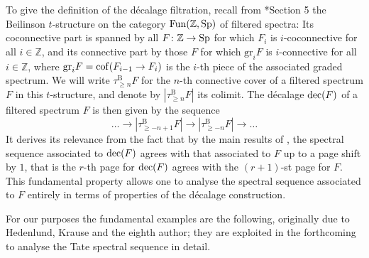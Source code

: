 To give the definition of the décalage filtration, recall from \cite{ariotta}*{Section 5} the Beilinson $t$-structure on the category $\operatorname{Fun}(\mathbb Z,\mathrm{Sp})$ of filtered spectra: Its coconnective part is spanned by all $F \colon \mathbb {\mathbb{Z}} \rightarrow \mathrm{Sp}$ for which $F_i$ is $i$-coconnective for all $i \in \mathbb Z$, and its connective part by those $F$ for which $\mathrm{gr}_iF$ is $i$-connective for all $i \in \mathbb Z$, where $\mathrm{gr}_iF = \operatorname{cof}(F_{i-1} \rightarrow F_i)$ is the $i$-th piece of the associated graded spectrum. We will write $\tau_{\geq n}^\mathrm B F$ for the $n$-th connective cover of a filtered spectrum $F$ in this $t$-structure, and denote by $|\tau_{\geq n}^\mathrm B F|$ its colimit.
The décalage $\mathrm{dec}(F)$ of a filtered spectrum $F$ is then given by the sequence
\[
\dots \longrightarrow |\tau_{\geq -n+1}^\mathrm B F| \longrightarrow |\tau_{\geq -n}^\mathrm B F| \longrightarrow \dots
\]
It derives its relevance from the fact that by the main results of \cite{antieau-dec}, the spectral sequence associated to $\mathrm{dec}(F)$ agrees with that associated to $F$ up to a page shift by $1$, that is the $r$-th page for $\mathrm{dec}(F)$ agrees with the $(r+1)$-st page for $F$. This fundamental property allows one to analyse the spectral sequence associated to $F$ entirely in terms of properties of the décalage construction. 

For our purposes the fundamental examples are the following, originally due to Hedenlund, Krause and the eighth author; they are exploited in the forthcoming \cite{KrauseHedenlundNikolaus} to analyse the Tate spectral sequence in detail.

